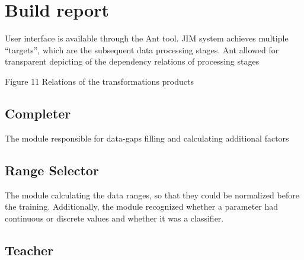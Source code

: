 \documentclass[10pt,oneside]{memoir}
\begin{document}
\chapter{Build report}
\label{buildreport}

User interface is available through the Ant tool. JIM system achieves multiple ``targets'', which are the subsequent data processing stages. Ant allowed for transparent depicting of the dependency relations of processing stages


\begin{figure}
\begin{center}
\end{center}
\label{figure11}
\end{figure}

Figure 11 Relations of the transformations products


\section{Completer}
\label{completer}

The module responsible for data-gaps filling and calculating additional factors


\section{Range Selector}
\label{rangeselector}

The module calculating the data ranges, so that they could be normalized before the training. Additionally, the module recognized whether a parameter had continuous or discrete values and whether it was a classifier.


\section{Teacher}
\label{teacher}
\end{document}
